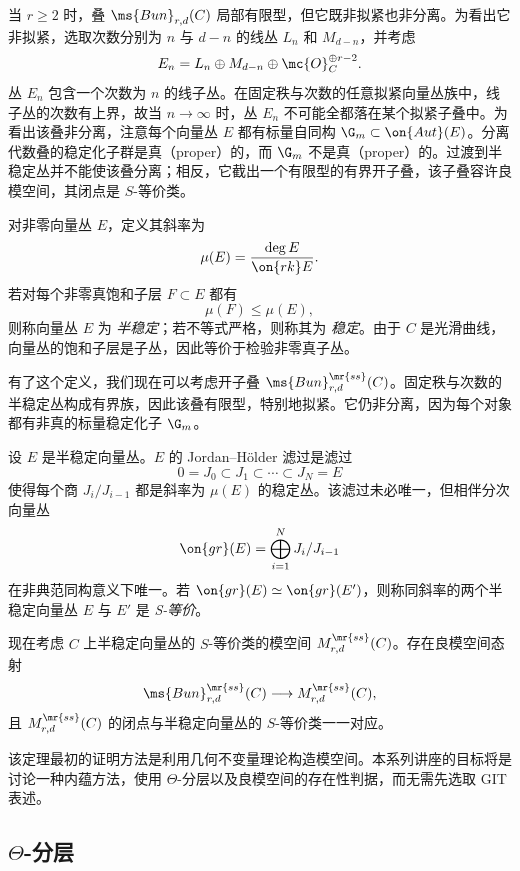当 \(r\geq 2\) 时，叠 \(\ms{Bun}_{r,d}(C)\) 局部有限型，但它既非拟紧也非分离。为看出它非拟紧，选取次数分别为 \(n\) 与 \(d-n\) 的线丛 \(L_n\) 和 \(M_{d-n}\)，并考虑
\[
    E_n=L_n\oplus M_{d-n}\oplus\mc{O}_C^{\oplus r-2}.
\]
丛 \(E_n\) 包含一个次数为 \(n\) 的线子丛。在固定秩与次数的任意拟紧向量丛族中，线子丛的次数有上界，故当 \(n\to\infty\) 时，丛 \(E_n\) 不可能全都落在某个拟紧子叠中。为看出该叠非分离，注意每个向量丛 \(E\) 都有标量自同构 \(\G_m\subset\on{Aut}(E)\)。分离代数叠的稳定化子群是真（proper）的，而 \(\G_m\) 不是真（proper）的。过渡到半稳定丛并不能使该叠分离；相反，它截出一个有限型的有界开子叠，该子叠容许良模空间，其闭点是 \(S\)-等价类。

\begin{defn}
    对非零向量丛 \(E\)，定义其斜率为
    \[ \mu(E)=\frac{\deg E}{\on{rk}E}. \]
    若对每个非零真饱和子层 \(F\subset E\) 都有
    \[ \mu(F)\leq\mu(E), \]
    则称向量丛 \(E\) 为 \textit{半稳定}；若不等式严格，则称其为 \textit{稳定}。由于 \(C\) 是光滑曲线，向量丛的饱和子层是子丛，因此等价于检验非零真子丛。
\end{defn}

有了这个定义，我们现在可以考虑开子叠 \(\ms{Bun}_{r,d}^{\mr{ss}}(C)\)。固定秩与次数的半稳定丛构成有界族，因此该叠有限型，特别地拟紧。它仍非分离，因为每个对象都有非真的标量稳定化子 \(\G_m\)。

\begin{defn}[S-equivalence]
    设 \(E\) 是半稳定向量丛。\(E\) 的 Jordan--H\"older 滤过是滤过
    \[ 0=J_0\subset J_1\subset\cdots\subset J_N=E \]
    使得每个商 \(J_i/J_{i-1}\) 都是斜率为 \(\mu(E)\) 的稳定丛。该滤过未必唯一，但相伴分次向量丛
    \[
        \on{gr}(E)=\bigoplus_{i=1}^N J_i/J_{i-1}
    \]
    在非典范同构意义下唯一。若 \(\on{gr}(E)\simeq\on{gr}(E')\)，则称同斜率的两个半稳定向量丛 \(E\) 与 \(E'\) 是 \textit{S-等价}。
\end{defn}

现在考虑 \(C\) 上半稳定向量丛的 \(S\)-等价类的模空间 \(M_{r,d}^{\mr{ss}}(C)\)。存在良模空间态射
\[
    \ms{Bun}_{r,d}^{\mr{ss}}(C)\longrightarrow M_{r,d}^{\mr{ss}}(C),
\]
且 \(M_{r,d}^{\mr{ss}}(C)\) 的闭点与半稳定向量丛的 \(S\)-等价类一一对应。

\begin{rmk}
    该定理最初的证明方法是利用几何不变量理论构造模空间。本系列讲座的目标将是讨论一种内蕴方法，使用 \(\Theta\)-分层以及良模空间的存在性判据，而无需先选取 GIT 表述。
\end{rmk}


\subsection{\(\Theta\)-分层}%
\label{sub:Theta-stratifications}

